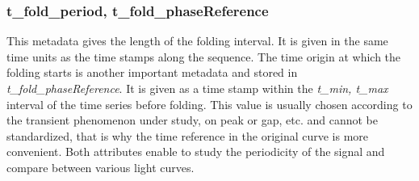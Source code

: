\documentclass[11pt,a4paper]{ivoa}
\begin{document}
\subsubsection{ t\_fold\_period,  t\_fold\_phaseReference}
This metadata gives the length  of the folding interval. It is given in the same time units as the time stamps along the sequence.
The time origin at which the folding starts is another important metadata and stored in
\emph{t\_fold\_phaseReference}. It is given as a time stamp within the \emph{t\_min, t\_max} interval of the time series before folding.
This value is usually chosen according to the transient phenomenon under study, on peak or gap, etc.  and cannot be standardized, that is why the time reference in the original curve is more convenient.
Both attributes enable to study the periodicity of the signal and compare between various light curves.

%
\end{document}

